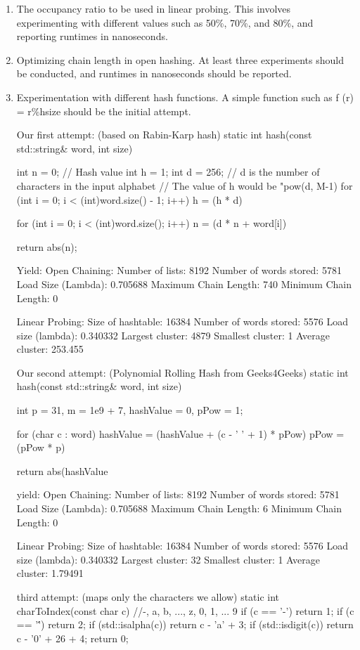 \documentclass[12pt]{article}
\begin{document}
\begin{enumerate}
\item 
The occupancy ratio to be used in linear probing. This involves experimenting with different values such
as 50\%, 70\%, and 80\%, and reporting runtimes in nanoseconds.

\item
Optimizing chain length in open hashing. At least three experiments should be conducted, and runtimes
in nanoseconds should be reported.

\item
Experimentation with different hash functions. A simple function such as f (r) = r\%hsize should be the
initial attempt.

Our first attempt: (based on Rabin-Karp hash)
static int hash(const std::string& word, int size) {
    int n = 0; // Hash value
    int h = 1;
    int d = 256; // d is the number of characters in the input alphabet 
    // The value of h would be "pow(d, M-1)%
    for (int i = 0; i < (int)word.size() - 1; i++)
        h = (h * d) %

    for (int i = 0; i < (int)word.size(); i++)
        n = (d * n + word[i]) %

    return abs(n);
}

Yield:
Open Chaining:
Number of lists: 8192
Number of words stored: 5781
Load Size (Lambda): 0.705688
Maximum Chain Length: 740
Minimum Chain Length: 0

Linear Probing:
Size of hashtable: 16384
Number of words stored: 5576
Load size (lambda): 0.340332
Largest cluster: 4879
Smallest cluster: 1
Average cluster: 253.455

Our second attempt: (Polynomial Rolling Hash from Geeks4Geeks)
static int hash(const std::string& word, int size) {
    int p = 31, m = 1e9 + 7, hashValue = 0, pPow = 1;

    for (char c : word) {
        hashValue = (hashValue + (c - ' ' + 1) * pPow) %
        pPow = (pPow * p) %
    }

    return abs(hashValue %
}

yield:
Open Chaining:
Number of lists: 8192
Number of words stored: 5781
Load Size (Lambda): 0.705688
Maximum Chain Length: 6
Minimum Chain Length: 0

Linear Probing:
Size of hashtable: 16384
Number of words stored: 5576
Load size (lambda): 0.340332
Largest cluster: 32
Smallest cluster: 1
Average cluster: 1.79491

third attempt: (maps only the characters we allow)
static int charToIndex(const char c) {
    //-, a, b, ..., z, 0, 1, ... 9
    if (c == '-') return 1;
    if (c == '\'') return 2;
    if (std::isalpha(c)) return c - 'a' + 3;
    if (std::isdigit(c)) return c - '0' + 26 + 4;
    return 0;
}


\end{enumerate}
\end{document}
